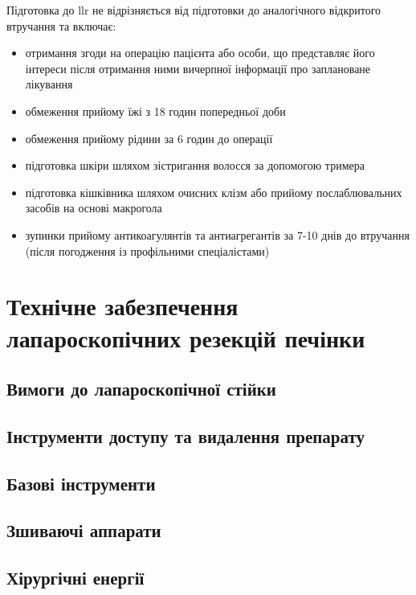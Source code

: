 \begin{refsection}
Підготовка до \acrshort{llr} не відрізняється від підготовки до аналогічного відкритого втручання та включає:
\begin{itemize}
    \item отримання згоди на операцію пацієнта або особи, що представляє його інтереси після отримання ними вичерпної інформації про заплановане лікування
    
    \item обмеження прийому їжі з 18 годин попередньої доби
    
    \item обмеження прийому рідини за 6 годин до операції
    
    \item підготовка шкіри шляхом зістригання волосся за допомогою тримера
    
    \item підготовка кішківника шляхом очисних клізм або прийому послаблювальних засобів на основі макрогола
    
    \item зупинки прийому антикоагулянтів та антиагрегантів за 7-10 днів до втручання (після погодження із профільними спеціалістами)
\end{itemize}



\section{Технічне забезпечення лапароскопічних резекцій печінки}

\subsection{Вимоги до лапароскопічної стійки}

\subsection{Інструменти доступу та видалення препарату}

\subsection{Базові інструменти}

\subsection{Зшиваючі аппарати}

\subsection{Хірургічні енергії}


\end{refsection}
